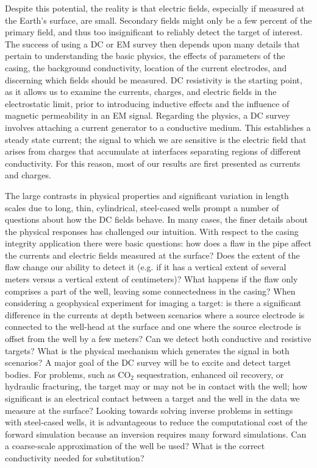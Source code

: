 \documentclass[extra,mreferee]{gji}
\begin{document}
Despite this potential, the reality is that electric fields, especially if measured at the Earth's surface, are small. Secondary fields might only be a few percent of the primary field, and thus too insignificant to reliably detect the target of interest. The success of using a DC or EM survey then depends upon many details that pertain to understanding the basic physics, the effects of parameters of the casing, the background conductivity, location of the current electrodes, and discerning which fields should be measured. DC resistivity is the starting point, as it allows us to examine the currents, charges, and electric fields in the electrostatic limit, prior to introducing inductive effects and the influence of magnetic permeability in an EM signal. Regarding the physics, a DC survey involves attaching a current generator to a conductive medium. This establishes a steady state current; the signal to which we are sensitive is the electric field that arises from charges that accumulate at interfaces separating regions of different conductivity. For this reason, most of our results are first presented as currents and charges.

The large contrasts in physical properties and significant variation in length scales due to long, thin, cylindrical, steel-cased wells prompt a number of questions about how the DC fields behave. In many cases, the finer details about the physical responses has challenged our intuition. With respect to the casing integrity application there were basic questions: how does a flaw in the pipe affect the currents and electric fields measured at the surface? Does the extent of the flaw change our ability to detect it (e.g. if it has a vertical extent of several meters versus a vertical extent of centimeters)? What happens if the flaw only comprises a part of the well, leaving some connectedness in the casing? When considering a geophysical experiment for imaging a target: is there a significant difference in the currents at depth between scenarios where a source electrode is connected to the well-head at the surface and one where the source electrode is offset from the well by a few meters? Can we detect both conductive and resistive targets? What is the physical mechanism which generates the signal in both scenarios? A major goal of the DC survey will be to excite and detect target bodies. For problems, such as CO$_2$ sequestration, enhanced oil recovery, or hydraulic fracturing, the target may or may not be in contact with the well; how significant is an electrical contact between a target and the well in the data we measure at the surface? Looking towards solving inverse problems in settings with steel-cased wells, it is advantageous to reduce the computational cost of the forward simulation because an inversion requires many forward simulations.  Can a coarse-scale approximation of the well be used? What is the correct conductivity needed for substitution?
\end{document}
